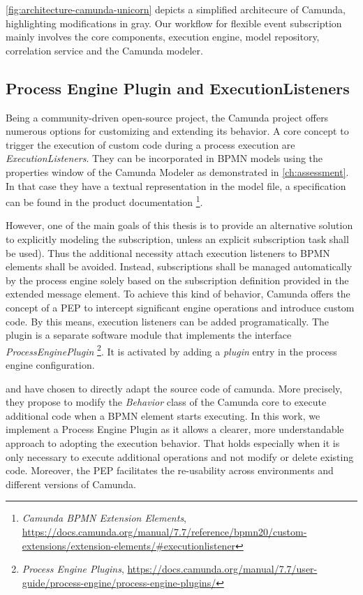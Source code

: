 \autoref{fig:architecture-camunda-unicorn} depicts a simplified architecure of Camunda, highlighting modifications in gray.
Our workflow for flexible event subscription mainly involves the core components, execution engine, model repository, correlation service and the Camunda modeler.

\subsection{Process Engine Plugin and ExecutionListeners}
Being a community-driven open-source project, the Camunda project offers numerous options for customizing and extending its behavior.
A core concept to trigger the execution of custom code during a process execution are \textit{ExecutionListeners}.
They can be incorporated in BPMN models using the properties window of the Camunda Modeler as demonstrated in \autoref{ch:assessment}. In that case they have a textual representation in the model file, a specification can be found in the product documentation
\footnote{\textit{Camunda BPMN Extension Elements}, \url{https://docs.camunda.org/manual/7.7/reference/bpmn20/custom-extensions/extension-elements/\#executionlistener}}.

However, one of the main goals of this thesis is to provide an alternative solution to explicitly modeling the subscription, unless an explicit subscription task shall be used). Thus the additional necessity attach execution listeners to BPMN elements shall be avoided.
Instead, subscriptions shall be managed automatically by the process engine solely based on the subscription definition provided in the extended message element.
To achieve this kind of behavior, Camunda offers the concept of a \ac{PEP} to intercept significant engine operations and introduce custom code. 
By this means, execution listeners can be added programatically.
The plugin is a separate software module that implements the interface \textit{ProcessEnginePlugin}
\footnote{\textit{Process Engine Plugins}, \url{https://docs.camunda.org/manual/7.7/user-guide/process-engine/process-engine-plugins/}}.
It is activated by adding a \textit{plugin} entry in the process engine configuration.

\cite{mandal:2017} and \cite{Pufahl2017} have chosen to directly adapt the source code of camunda. More precisely, they propose to modify the \textit{Behavior} class of the Camunda core to execute additional code when a BPMN element starts executing.
In this work, we implement a Process Engine Plugin as it allows a clearer, more understandable approach to adopting the execution behavior. 
That holds especially when it is only necessary to execute additional operations and not modify or delete existing code.
Moreover, the PEP facilitates the re-usability across environments and different versions of Camunda.

